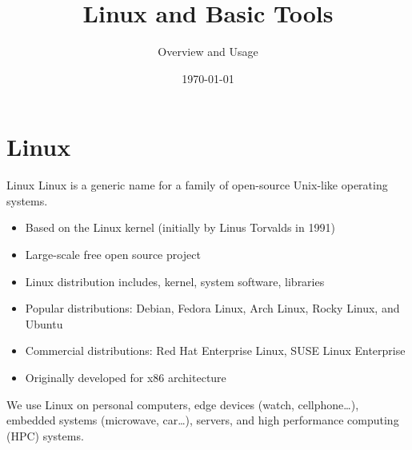 \documentclass{setbeamer}
\title{Linux and Basic Tools}
\subtitle{Overview and Usage}
\institute{\theChairName\\\theDepartmentName\\\theUniversityName}
\date[\today]{\today}
\begin{document}
 
\maketitle

\section{Linux}

\begin{frame}{Linux}
    Linux is a generic name for a family of open-source Unix-like operating systems.\\

    \begin{itemize}
        \item Based on the Linux kernel (initially by Linus Torvalds in 1991)
        \item Large-scale free open source project
        \item Linux distribution includes, kernel, system software, libraries
        \item Popular distributions:  Debian, Fedora Linux, Arch Linux, Rocky Linux, and Ubuntu
        \item Commercial distributions: Red Hat Enterprise Linux, SUSE Linux Enterprise
        \item Originally developed for x86 architecture
    \end{itemize}
    \vspace{0.3cm}

	We use Linux on personal computers, edge devices (watch, cellphone\dots ), embedded systems (microwave, car\dots), servers, and high performance computing (HPC) systems.
\end{frame}
\end{document}
